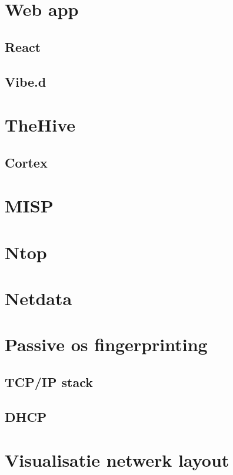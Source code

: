 \documentclass[a4paper,12pt]{report}
\begin{document}
\section{Web app}
\subsection{React}
\subsection{Vibe.d}

\section{TheHive}
\subsection{Cortex}
\section{MISP}
\section{Ntop}
\section{Netdata}

\section{Passive os fingerprinting}
\subsection{TCP/IP stack}
\subsection{DHCP}

\section{Visualisatie netwerk layout}
\end{document}
